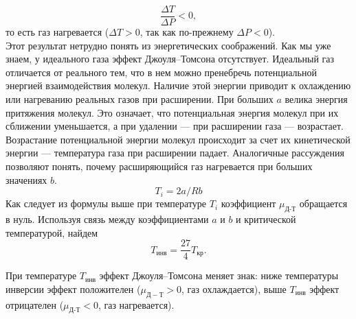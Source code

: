 \documentclass[a4paper, 12pt]{article}%
\begin{document}
	\begin{equation}
		\dfrac{\Delta T}{\Delta P} < 0,
	\end{equation}
	то есть газ нагревается ($\Delta T > 0$, так как по-прежнему $\Delta P < 0$).\\
	Этот результат нетрудно понять из энергетических соображений. Как мы уже знаем, у идеального газа эффект Джоуля–Томсона отсутствует. Идеальный газ отличается от реального тем, что в нем можно пренебречь потенциальной энергией взаимодействия молекул. Наличие этой энергии приводит к охлаждению или нагреванию реальных газов при расширении. При больших $a$ велика энергия притяжения молекул. Это означает, что потенциальная энергия молекул при их сближении уменьшается, а при удалении --- при расширении газа --- возрастает. Возрастание потенциальной энергии молекул происходит за счет их кинетической энергии --- температура газа при расширении падает. Аналогичные рассуждения позволяют понять, почему расширяющийся газ нагревается при больших значениях $b$.\\
 $$ T_i = 2a/Rb$$	Как следует из формулы выше при температуре $T_i$ коэффициент $\mu_{\text{Д-Т}} $ обращается в нуль. Используя связь между коэффициентами $a$ и $b$ и критической температурой, найдем
	\begin{equation}
		T_{\text{инв}} = \dfrac{27}{4}T_{\text{кр}}.
	\end{equation}
	
	
	При температуре $T_{\text{инв}}$ эффект Джоуля–Томсона меняет знак: ниже температуры инверсии эффект положителен ($\mu_{Д-Т} > 0$, газ охлаждается), выше $T_{\text{инв}}$ эффект отрицателен ($\mu_{\text{Д-Т}} < 0$, газ нагревается).\\
	
	
	
\end{document}
